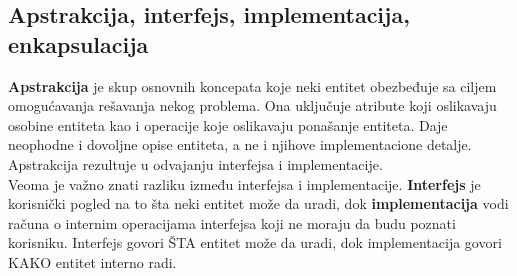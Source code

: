\documentclass[../main.tex]{subfiles}
\begin{document}
\subsection{Apstrakcija, interfejs, implementacija, enkapsulacija}
{\bf Apstrakcija} je skup osnovnih koncepata koje neki entitet obezbeđuje sa ciljem omogućavanja rešavanja nekog problema. Ona uključuje atribute koji oslikavaju osobine entiteta kao i operacije koje oslikavaju ponašanje entiteta. Daje neophodne i dovoljne opise entiteta, a ne i njihove implementacione detalje. Apstrakcija rezultuje u odvajanju interfejsa i implementacije. 
\\
Veoma je važno znati razliku između interfejsa i implementacije. {\bf Interfejs} je korisnički pogled na to šta neki entitet može da uradi, dok {\bf implementacija} vodi računa o internim operacijama interfejsa koji ne moraju da budu poznati korisniku. Interfejs govori ŠTA entitet može da uradi, dok implementacija govori KAKO entitet interno radi.
\end{document}
